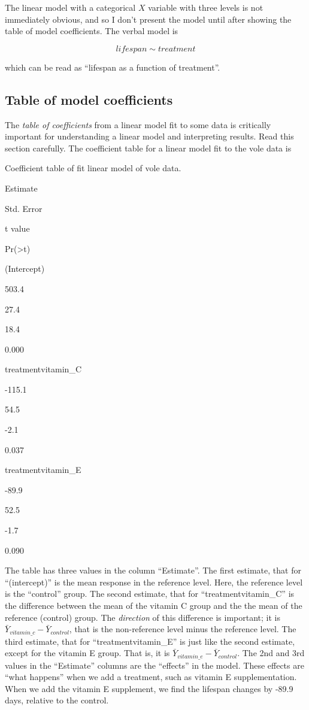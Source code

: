 \documentclass[]{book}
\begin{document}
The linear model with a categorical \(X\) variable with three levels is not immediately obvious, and so I don't present the model until after showing the table of model coefficients. The verbal model is

\begin{equation}
lifespan \sim treatment
\end{equation}

which can be read as ``lifespan as a function of treatment''.

\hypertarget{table-of-model-coefficients}{%
\subsection{Table of model coefficients}\label{table-of-model-coefficients}}

The \emph{table of coefficients} from a linear model fit to some data is critically important for understanding a linear model and interpreting results. Read this section carefully. The coefficient table for a linear model fit to the vole data is

\label{tab:vole-table}Coefficient table of fit linear model of vole data.

Estimate

Std. Error

t value

Pr(\textgreater\textbar t\textbar)

(Intercept)

503.4

27.4

18.4

0.000

treatmentvitamin\_C

-115.1

54.5

-2.1

0.037

treatmentvitamin\_E

-89.9

52.5

-1.7

0.090

The table has three values in the column ``Estimate''. The first estimate, that for ``(intercept)'' is the mean response in the reference level. Here, the reference level is the ``control'' group. The second estimate, that for ``treatmentvitamin\_C'' is the difference between the mean of the vitamin C group and the the mean of the reference (control) group. The \emph{direction} of this difference is important; it is \(\bar{Y}_{vitamin\_c} - \bar{Y}_{control}\), that is the non-reference level minus the reference level. The third estimate, that for ``treatmentvitamin\_E'' is just like the second estimate, except for the vitamin E group. That is, it is \(\bar{Y}_{vitamin\_e} - \bar{Y}_{control}\). The 2nd and 3rd values in the ``Estimate'' columns are the ``effects'' in the model. These effects are ``what happens'' when we add a treatment, such as vitamin E supplementation. When we add the vitamin E supplement, we find the lifespan changes by -89.9 days, relative to the control.
\end{document}

